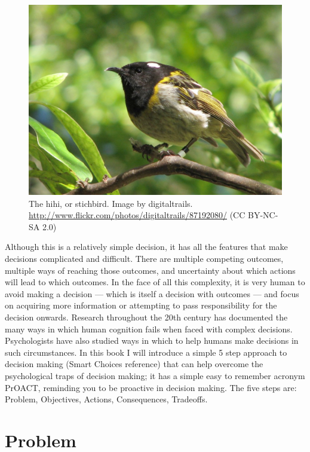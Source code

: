 \documentclass[]{book}
\begin{document}
\begin{figure}[htbp]
\centering
\includegraphics{images/hihi_digitaltrails_cc_nc.jpg}
\caption{\label{fig:hihi}The hihi, or stichbird. Image by digitaltrails.
\url{http://www.flickr.com/photos/digitaltrails/87192080/} (CC BY-NC-SA
2.0)}
\end{figure}

Although this is a relatively simple decision, it has all the features
that make decisions complicated and difficult. There are multiple
competing outcomes, multiple ways of reaching those outcomes, and
uncertainty about which actions will lead to which outcomes. In the face
of all this complexity, it is very human to avoid making a decision ---
which is itself a decision with outcomes --- and focus on acquiring more
information or attempting to pass responsibility for the decision
onwards. Research throughout the 20th century has documented the many
ways in which human cognition fails when faced with complex decisions.
Psychologists have also studied ways in which to help humans make
decisions in such circumstances. In this book I will introduce a simple
5 step approach to decision making (Smart Choices reference) that can
help overcome the psychological traps of decision making; it has a
simple easy to remember acronym PrOACT, reminding you to be proactive in
decision making. The five steps are: Problem, Objectives, Actions,
Consequences, Tradeoffs.

\section{Problem}\label{problem}
\end{document}
